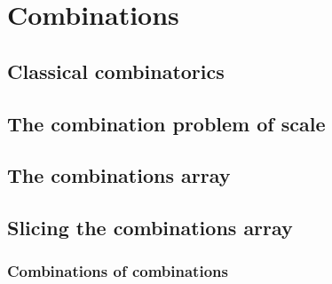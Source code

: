 \chapter{Combinations}
\section{Classical combinatorics}

\section{The combination problem of scale}

\section{The combinations array}

\section{Slicing the combinations array}
\subsection{Combinations of combinations}
